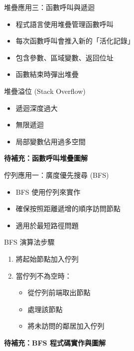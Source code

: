 \documentclass{beamer}
\begin{document}
\begin{frame}{堆疊應用三：函數呼叫與遞迴}
\begin{itemize}
    \item 程式語言使用堆疊管理函數呼叫
    \item 每次函數呼叫會推入新的「活化記錄」
    \item 包含參數、區域變數、返回位址
    \item 函數結束時彈出堆疊
\end{itemize}

\vspace{1em}
\begin{block}{堆疊溢位 (Stack Overflow)}
\begin{itemize}
    \item 遞迴深度過大
    \item 無限遞迴
    \item 局部變數佔用過多空間
\end{itemize}
\end{block}

\vspace{1em}
\textbf{待補充：函數呼叫堆疊圖解}
\end{frame}

\begin{frame}{佇列應用一：廣度優先搜尋 (BFS)}
\begin{itemize}
    \item BFS 使用佇列來實作
    \item 確保按照距離遞增的順序訪問節點
    \item 適用於最短路徑問題
\end{itemize}

\vspace{1em}
\begin{block}{BFS 演算法步驟}
\begin{enumerate}
    \item 將起始節點加入佇列
    \item 當佇列不為空時：
    \begin{itemize}
        \item 從佇列前端取出節點
        \item 處理該節點
        \item 將未訪問的鄰居加入佇列
    \end{itemize}
\end{enumerate}
\end{block}

\vspace{1em}
\textbf{待補充：BFS 程式碼實作與圖解}
\end{frame}
\end{document}
